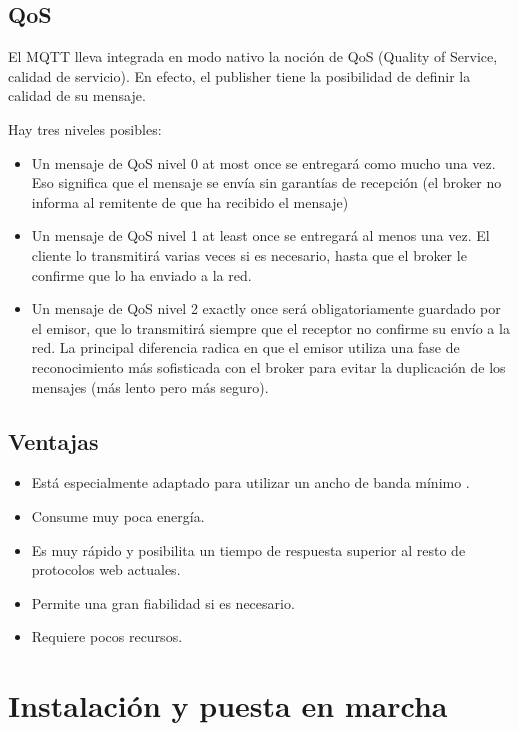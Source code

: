 \subsection{QoS}
El MQTT lleva integrada en modo nativo la noción de QoS (Quality of Service, calidad de servicio). En efecto, el publisher tiene la posibilidad de definir la calidad de su mensaje.

Hay tres niveles posibles:
\begin{itemize}
\item Un mensaje de QoS nivel 0 at most once se entregará como mucho una vez. Eso significa que el mensaje se envía sin garantías de recepción (el broker no informa al remitente de que ha recibido el mensaje)
\item Un mensaje de QoS nivel 1 at least once se entregará al menos una vez. El cliente lo transmitirá varias veces si es necesario, hasta que el broker le confirme que lo ha enviado a la red.
\item Un mensaje de QoS nivel 2 exactly once será obligatoriamente guardado por el emisor, que lo transmitirá siempre que el receptor no confirme su envío a la red. La principal diferencia radica en que el emisor utiliza una fase de reconocimiento más sofisticada con el broker para evitar la duplicación de los mensajes (más lento pero más seguro).
\end{itemize}

\subsection{Ventajas}
\begin{itemize}  
\item Está especialmente adaptado para utilizar un ancho de banda mínimo .
\item Consume muy poca energía.
\item Es muy rápido y posibilita un tiempo de respuesta superior al resto de protocolos web actuales.
\item Permite una gran fiabilidad si es necesario.
\item Requiere pocos recursos.
\end{itemize}

\section{Instalación y puesta en marcha}
\label{makereference3.5}